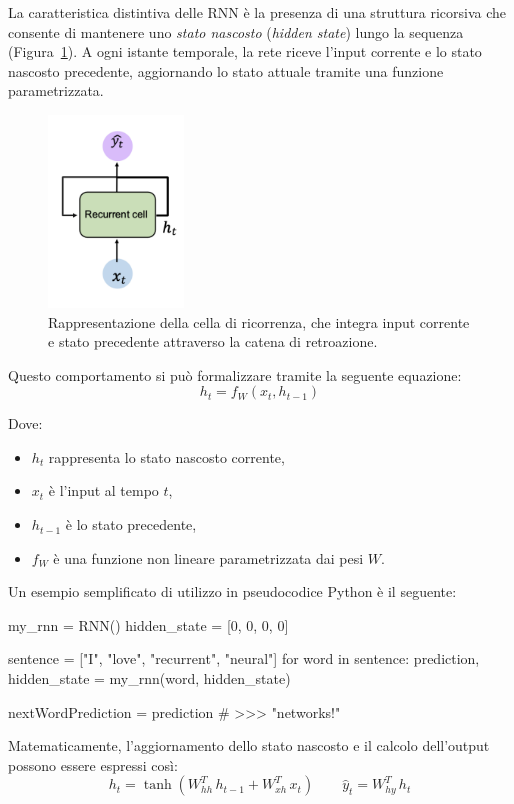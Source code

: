 La caratteristica distintiva delle RNN è la presenza di una struttura ricorsiva che consente di mantenere uno \textit{stato nascosto} (\textit{hidden state}) lungo la sequenza (Figura~\ref{fig:recurrency_cell}). A ogni istante temporale, la rete riceve l'input corrente e lo stato nascosto precedente, aggiornando lo stato attuale tramite una funzione parametrizzata.
\begin{figure}
    \centering
    \includegraphics[width=0.32\textwidth]{figure/Recurrency_RNN.png}
    \caption{Rappresentazione della cella di ricorrenza, che integra input corrente e stato precedente attraverso la catena di retroazione.}
    \label{fig:recurrency_cell}
\end{figure}
Questo comportamento si può formalizzare tramite la seguente equazione:
\begin{equation}
    h_t = f_W(x_t, h_{t-1})
\end{equation}

Dove:
\begin{itemize}
    \item $h_t$ rappresenta lo stato nascosto corrente,
    \item $x_t$ è l'input al tempo $t$,
    \item $h_{t-1}$ è lo stato precedente,
    \item $f_W$ è una funzione non lineare parametrizzata dai pesi $W$.
\end{itemize}

Un esempio semplificato di utilizzo in pseudocodice Python è il seguente:
\vspace{0.5em}
\begin{python}
my_rnn = RNN()
hidden_state = [0, 0, 0, 0]

sentence = ["I", "love", "recurrent", "neural"]
for word in sentence:
    prediction, hidden_state = my_rnn(word, hidden_state)

nextWordPrediction = prediction
# >>> "networks!"
\end{python}
\vspace{0.5em}
Matematicamente, l'aggiornamento dello stato nascosto e il calcolo dell'output possono essere espressi così:
\begin{equation}
    h_t = \tanh(W_{hh}^T\,h_{t-1} + W_{xh}^T\,x_t) \qquad \hat{y}_t = W_{hy}^T\,h_t
\end{equation}

